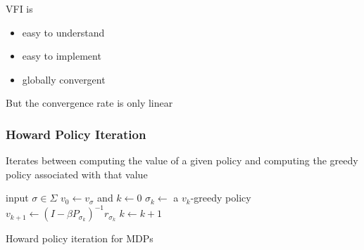 \documentclass[xcolor=dvipsnames]{beamer}
\newcommand{\1}{\mathbbm 1}
\begin{document}
\begin{frame}
    

    VFI is 
    \begin{itemize}
        \vspace{0.5em}
        \item easy to understand
        \vspace{0.5em}
        \item easy to implement 
        \vspace{0.5em}
        \item globally convergent
    \end{itemize}

    \vspace{0.5em}
    \vspace{0.5em}
    \vspace{0.5em}
    \vspace{0.5em}
    But the convergence rate is only linear  

\end{frame}


\begin{frame}
    \frametitle{Howard Policy Iteration}

    \begin{figure}
       \begin{center}
           \scalebox{0.7}{}
        \vspace{1em}
       \end{center}
    \end{figure}

    Iterates between computing the value of a given policy
    and computing the greedy policy associated with that value

\end{frame}

\begin{frame}
        
    {\small
    \begin{algorithm}[H]
        \DontPrintSemicolon
        input $\sigma \in \Sigma$ \;
        $v_0 \leftarrow v_\sigma$ and $k \leftarrow 0$  \;
        \Repeat
        {
            $\sigma_k \leftarrow $ a $v_k$-greedy policy \;
            $v_{k+1} \leftarrow (I - \beta P_{\sigma_k} )^{-1} r_{\sigma_k}$ \;
            $k \leftarrow k + 1$ \;
        }
        \caption{\label{algo:fshpi} Howard policy iteration for MDPs}
    \end{algorithm}
    }

\end{frame}
\end{document}
